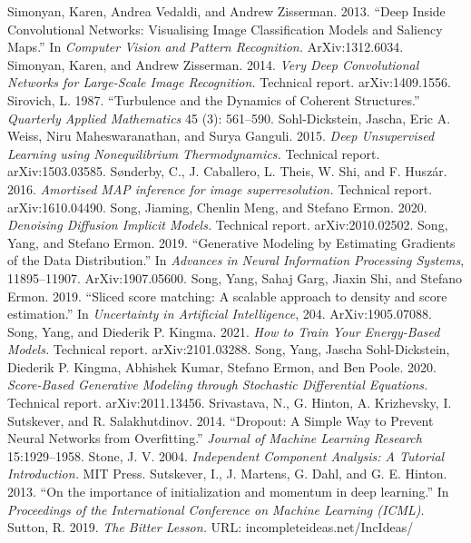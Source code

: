 Simonyan, Karen, Andrea Vedaldi, and Andrew Zisserman. 2013. ``Deep Inside Convolutional Networks: Visualising Image Classification Models and Saliency Maps.'' In \emph{Computer Vision and Pattern Recognition.} ArXiv:1312.6034.
 Simonyan, Karen, and Andrew Zisserman. 2014. \emph{Very Deep Convolutional Networks for Large-Scale Image Recognition.} Technical report. arXiv:1409.1556.
 Sirovich, L. 1987. ``Turbulence and the Dynamics of Coherent Structures.'' \emph{Quarterly Applied Mathematics} 45 (3): 561--590.
 Sohl-Dickstein, Jascha, Eric A. Weiss, Niru Maheswaranathan, and Surya Ganguli. 2015. \emph{Deep Unsupervised Learning using Nonequilibrium Thermodynamics.} Technical report. arXiv:1503.03585.
 S\o nderby, C., J. Caballero, L. Theis, W. Shi, and F. Husz\'ar. 2016. \emph{Amortised MAP inference for image superresolution.} Technical report. arXiv:1610.04490.
 Song, Jiaming, Chenlin Meng, and Stefano Ermon. 2020. \emph{Denoising Diffusion Implicit Models.} Technical report. arXiv:2010.02502.
 Song, Yang, and Stefano Ermon. 2019. ``Generative Modeling by Estimating Gradients of the Data Distribution.'' In \emph{Advances in Neural Information Processing Systems}, 11895--11907. ArXiv:1907.05600.
 Song, Yang, Sahaj Garg, Jiaxin Shi, and Stefano Ermon. 2019. ``Sliced score matching: A scalable approach to density and score estimation.'' In \emph{Uncertainty in Artificial Intelligence}, 204. ArXiv:1905.07088.
 Song, Yang, and Diederik P. Kingma. 2021. \emph{How to Train Your Energy-Based Models.} Technical report. arXiv:2101.03288.
 Song, Yang, Jascha Sohl-Dickstein, Diederik P. Kingma, Abhishek Kumar, Stefano Ermon, and Ben Poole. 2020. \emph{Score-Based Generative Modeling through Stochastic Differential Equations.} Technical report. arXiv:2011.13456.
 Srivastava, N., G. Hinton, A. Krizhevsky, I. Sutskever, and R. Salakhutdinov. 2014. ``Dropout: A Simple Way to Prevent Neural Networks from Overfitting.'' \emph{Journal of Machine Learning Research} 15:1929--1958.
 Stone, J. V. 2004. \emph{Independent Component Analysis: A Tutorial Introduction.} MIT Press.
 Sutskever, I., J. Martens, G. Dahl, and G. E. Hinton. 2013. ``On the importance of initialization and momentum in deep learning.'' In \emph{Proceedings of the International Conference on Machine Learning (ICML)}.
 Sutton, R. 2019. \emph{The Bitter Lesson.} URL: incompleteideas.net/IncIdeas/
